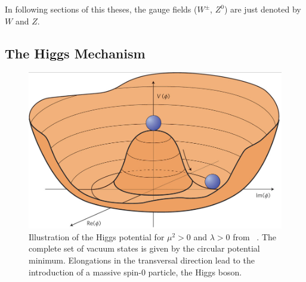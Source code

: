  In following sections of this theses, the gauge fields ($W^\pm$, $Z^0$) are just denoted by $W$ and $Z$.



 
\subsection{The Higgs Mechanism}\label{Higgsm}
\begin{figure}[h]
	\centering
	\includegraphics[width=0.4\linewidth]{Pics/cp1/Higgs}
	\caption{Illustration of the Higgs potential for $\mu^2>0 $ and $\lambda>0$ from ~\cite{Ellis:2013jnq}. The complete set of vacuum states is given by the circular potential minimum. Elongations in the transversal direction lead to the introduction of a massive spin-0 particle, the Higgs boson.}
	
	\label{fig:Higgs}
\end{figure}

